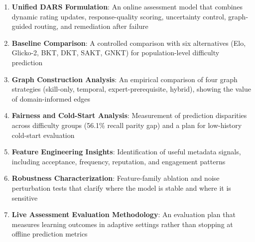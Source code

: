 \documentclass[conference]{IEEEtran}
\begin{document}
\begin{enumerate}
    \item \textbf{Unified DARS Formulation}: An online assessment model that combines dynamic rating updates, response-quality scoring, uncertainty control, graph-guided routing, and remediation after failure
    \item \textbf{Baseline Comparison}: A controlled comparison with six alternatives (Elo, Glicko-2, BKT, DKT, SAKT, GNKT) for population-level difficulty prediction
    \item \textbf{Graph Construction Analysis}: An empirical comparison of four graph strategies (skill-only, temporal, expert-prerequisite, hybrid), showing the value of domain-informed edges
    \item \textbf{Fairness and Cold-Start Analysis}: Measurement of prediction disparities across difficulty groups (56.1\% recall parity gap) and a plan for low-history cold-start evaluation
    \item \textbf{Feature Engineering Insights}: Identification of useful metadata signals, including acceptance, frequency, reputation, and engagement patterns
    \item \textbf{Robustness Characterization}: Feature-family ablation and noise perturbation tests that clarify where the model is stable and where it is sensitive
    \item \textbf{Live Assessment Evaluation Methodology}: An evaluation plan that measures learning outcomes in adaptive settings rather than stopping at offline prediction metrics
\end{enumerate}
\end{document}
